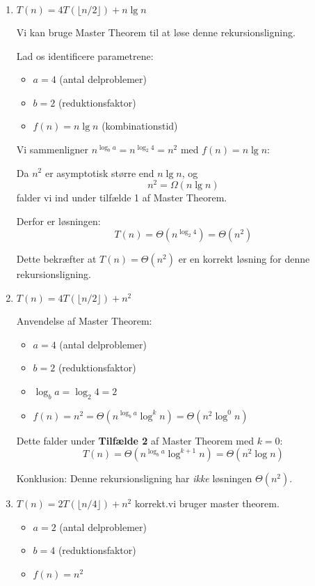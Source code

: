 \documentclass{article}
\theoremstyle{definition}
\begin{document}
\begin{enumerate}
    \item $T(n) = 4T(\lfloor n/2 \rfloor) + n\lg n$
    
    Vi kan bruge Master Theorem til at løse denne rekursionsligning.
    
    Lad os identificere parametrene:
    \begin{itemize}
        \item $a = 4$ (antal delproblemer)
        \item $b = 2$ (reduktionsfaktor)
        \item $f(n) = n\lg n$ (kombinationstid)
    \end{itemize}
    
    Vi sammenligner $n^{\log_b a} = n^{\log_2 4} = n^2$ med $f(n) = n\lg n$:
    
    Da $n^2$ er asymptotisk større end $n\lg n$, og
    \[ n^2 = \Omega(n\lg n) \]
    falder vi ind under tilfælde 1 af Master Theorem.
    
    Derfor er løsningen:
    \[ T(n) = \Theta(n^{\log_2 4}) = \Theta(n^2) \]
    
    Dette bekræfter at $T(n) = \Theta(n^2)$ er en korrekt løsning for denne rekursionsligning.
    
    \item $T(n) = 4T(\lfloor n/2 \rfloor) + n^2$
    
    Anvendelse af Master Theorem:
    \begin{itemize}
        \item $a = 4$ (antal delproblemer)
        \item $b = 2$ (reduktionsfaktor)
        \item $\log_b a = \log_2 4 = 2$
        \item $f(n) = n^2 = \Theta(n^{\log_b a} \log^k n) = \Theta(n^2 \log^0 n)$
    \end{itemize}
    
    Dette falder under \textbf{Tilfælde 2} af Master Theorem med $k = 0$:
    \[ T(n) = \Theta(n^{\log_b a} \log^{k+1} n) = \Theta(n^2 \log n) \]
    
    Konklusion: Denne rekursionsligning har \textit{ikke} løsningen $\Theta(n^2)$.
    
    \item $T(n) = 2T(\lfloor n/4 \rfloor) + n^2$
    korrekt.vi bruger master theorem. 

    \begin{itemize}
        \item $a = 2$ (antal delproblemer)
        \item $b = 4$ (reduktionsfaktor)
        \item $f(n) = n^2$ 
    \end{itemize}


\end{enumerate}
\end{document}
